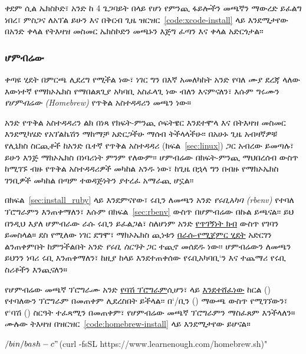 ቀደም ሲል ኤክስኮድ፣ አንድ ከ 4 ጌጋባይት በላይ የሆነ የምንጪ ፋይሎችን መጫኛን ማውረድ ይፈልግ ነበረ፣ ምስጋና ለአፕል ይሁን እና በቅርብ ጊዜ ዝርዝር~\ref{code:xcode-install} ላይ እንደሚታየው በአንድ ቀላል የትእዛዝ መስመር ኤክስኮድን መጫኑን እጅግ ፈጣን እና ቀላል አድርጎታል፡፡

\begin{codelisting}
\label{code:xcode-install}
\end{codelisting}


\subsubsection{ሆምብሬው}
\label{sec:homebrew}

ቀጣዩ ሂደት በምርጫ ሊደረግ የሚችል ነው፣ ነገር ግን በእኛ አመለካከት አንድ የባለ ሙያ ደረጃ ላለው እውነተኛ የማክኦኤክስ የማበልጸጊያ አካባቢ አስፈላጊ ነው ብለን እናምናለን፣ እሱም ግሩሙን \emph{የሆምብሬው (Homebrew)} የጥቅል አስተዳዳሪን መጫን ነው።

አንድ የጥቅል አስተዳዳሪን ልክ በነጻ የክፍት-ምንጪ ሶፍትዌር እንደተሞላ እና በትእዛዝ መስመር እንደሚካሄድ የአፕልኬሽን ማከማቻ አድርጋችሁ ማሰብ ትችላላችሁ፡፡ በአሁኑ ጊዜ አብዛኛዎቹ የሊኒክስ ስርጪቶች ከአንድ ቤተኛ የጥቅል አስተዳዳሪ (ክፍል~\ref{sec:linux}) ጋር አብረው ይመጣሉ፣ ይሁን እንጅ ማክኦኤክስ በነባሪነት ምንም የለውም፡፡ ሆምብሬው በክፍት-ምንጪ ማህበረሰብ ውስጥ ከሚገኙ ብዙ የጥቅል አስተዳዳሪዎች መካከል አንዱ ነው፣ ከጊዜ በኋላ ግን በብዙ የማክኦኤክስ ገንቢዎች መካከል በጣም ተወዳጅነትን ያተረፈ አማራጪ ሆኗል፡፡

በክፍል~\ref{sec:install_ruby} ላይ እንደምናየው፣ ሩቢን ለመጫን አንድ \emph{የሩቢአካባ (rbenv)} የተባለ ፕሮግራምን እንጠቀማለን፣ እሱም በክፍል~\ref{sec:rbenv} ውስጥ በሆምብሬው በኩል ይጫናል፡፡ ይህ በንዲህ እያለ ሆምብራው ራሱ ሩቢን ይፈልጋል፣ ስለሆነም አንድ \href{https://en.wikipedia.org/wiki/Circular_dependency}{የጥገኝነት ክብ} ውስጥ የገባን ይመስላል። ደስ የሚለው ነገር ደግሞ፣ ማክኦኤክስ ጪነቱን \href{https://en.wikipedia.org/wiki/Bootstrapping}{በራሱ-የሚጀምር ሂደት} አድርገን ልንጠቀምበት ከምንችልበት አንድ \emph{የሩቢ ስርዓት} ጋር ተጪኖ መሰደዱ ነው፡፡ ሆምብሬውን ለመጫን ይህንን ነባሪ ሩቢ እንጠቀማለን፣ ከዚያ ከላይ እንደተጠቀሰው የሩቢአካባቢ`ን እና ተጨማሪ የሩቢ ስሪቶችን እንጪናለን።

የሆምብሬው መጫኛ ፕሮግራሙ አንድ \href{https://www.learnenough.com/text-editor-tutorial/advanced_text_editing#sec-writing_an_executable_script}{የባሽ ፕሮግራም}ሲሆን፣ \lecl ላይ \href{https://www.learnenough.com/command-line-tutorial#sec-downloading_a_file}{እንደተሸፈነው} ከርል () የተባለውን ፕሮግራም በመጠቀም ሊደረስበት ይችላል፡፡ በ`/ቢን () ማውጫ ውስጥ የሚገኘውን፣ የ`ባሽ () ስርዓት ተፈጻሚን በመጠቀም፣ የሆምብሬው መጫኛ ፕሮግራምን ማስፈጸም እንችላለን። ሙሉው ትእዛዝ በዝርዝር~\ref{code:homebrew-install} ላይ እንደሚታየው ይሆናል።

\begin{codelisting}
\label{code:homebrew-install}
\begin{code}
$ /bin/bash -c "$(curl -fsSL https://www.learnenough.com/homebrew.sh)"
\end{code}
\end{codelisting}

